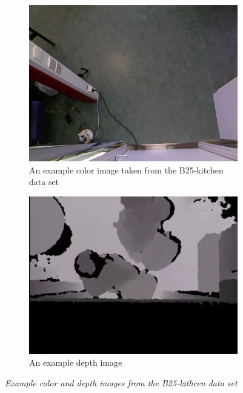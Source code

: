 \newpage

\begin{figure}[H]
\centering
\begin{subfigure}{.5\textwidth}
  \centering
  \includegraphics[width=0.9\linewidth]{images/B25-Kitchen-color.png}
  \caption{An example color image taken from the B25-kitchen data set}
  \label{fig:sub1}
\end{subfigure}%
\begin{subfigure}{.5\textwidth}
  \centering
  \includegraphics[width=0.9\linewidth]{images/B25FOLK.png}
  \caption{An example depth image}
  \label{fig:sub2}
\end{subfigure}
\caption[R-kitchen exits]{\textit{Example color and depth images from the B25-kithcen data set}}
\label{fig:B25-kitchen example}
\end{figure}

